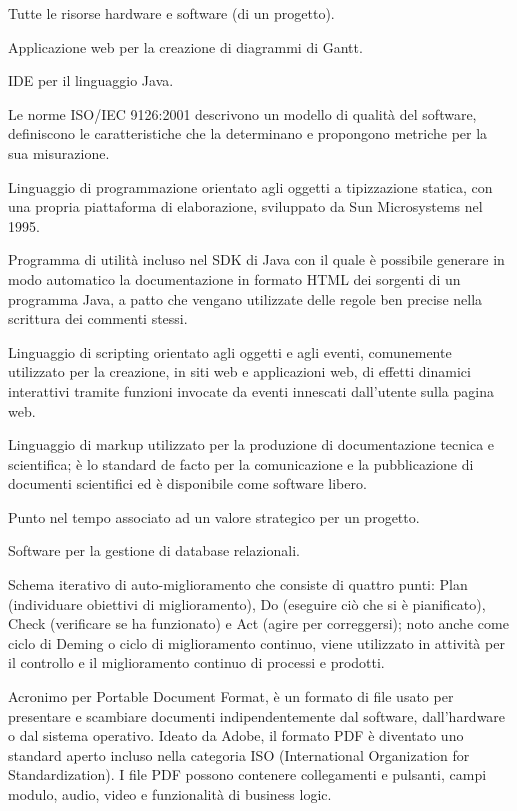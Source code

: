 \item[Infrastruttura] Tutte le risorse hardware e software (di un progetto).
\item[Instagantt] Applicazione web per la creazione di diagrammi di Gantt.
\item[IntelliJ Idea] IDE per il linguaggio Java.
\item[ISO/IEC 9126:2001] Le norme ISO/IEC 9126:2001 descrivono un modello di qualità del software, definiscono le caratteristiche che la determinano e propongono metriche per la sua misurazione.
\item[Java] Linguaggio di programmazione orientato agli oggetti a tipizzazione statica, con una propria piattaforma di elaborazione, sviluppato da Sun Microsystems nel 1995.
\item[Javadoc] Programma di utilità incluso nel SDK di Java con il quale è possibile generare in modo automatico la documentazione in formato HTML dei sorgenti di un programma Java, a patto che vengano utilizzate delle regole ben precise nella scrittura dei commenti stessi.
\item[JavaScript] Linguaggio di scripting orientato agli oggetti e agli eventi, comunemente utilizzato per la creazione, in siti web e applicazioni web, di effetti dinamici interattivi tramite funzioni invocate da eventi innescati dall’utente sulla pagina web.
\item[Latex] Linguaggio di markup utilizzato per la produzione di documentazione tecnica e scientifica; è lo standard de facto per la comunicazione e la pubblicazione di documenti scientifici ed è disponibile come software libero.
\item[Milestone] Punto nel tempo associato ad un valore strategico per un progetto.
\item[MySQL] Software per la gestione di database relazionali.
\item[PDCA (schema)] Schema iterativo di auto-miglioramento che consiste di quattro punti: Plan (individuare obiettivi di miglioramento), Do (eseguire ciò che si è pianificato), Check (verificare se ha funzionato) e Act (agire per correggersi); noto anche come ciclo di Deming o ciclo di miglioramento continuo, viene utilizzato in attività per il controllo e il miglioramento continuo di processi e prodotti.
\item[PDF] Acronimo per Portable Document Format, è un formato di file usato per presentare e scambiare documenti indipendentemente dal software, dall'hardware o dal sistema operativo. Ideato da Adobe, il formato PDF è diventato uno standard aperto incluso nella categoria ISO (International Organization for Standardization). I file PDF possono contenere collegamenti e pulsanti, campi modulo, audio, video e funzionalità di business logic.
